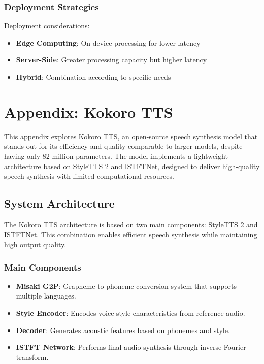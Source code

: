 \subsection{Deployment Strategies}
Deployment considerations:

\begin{itemize}
	\item \textbf{Edge Computing}: On-device processing for lower latency
	\item \textbf{Server-Side}: Greater processing capacity but higher latency
	\item \textbf{Hybrid}: Combination according to specific needs
\end{itemize}

\chapter{Appendix: Kokoro TTS}
\label{appendix-kokoro}

This appendix explores Kokoro TTS, an open-source speech synthesis model that stands out for its efficiency and quality comparable to larger models, despite having only 82 million parameters. The model implements a lightweight architecture based on StyleTTS 2 and ISTFTNet, designed to deliver high-quality speech synthesis with limited computational resources.

\section{System Architecture}
\label{sec:kokoro-architecture}

The Kokoro TTS architecture is based on two main components: StyleTTS 2 and ISTFTNet. This combination enables efficient speech synthesis while maintaining high output quality.

\subsection{Main Components}
\label{subsec:kokoro-main-components}

\begin{itemize}
	\item \textbf{Misaki G2P}: Grapheme-to-phoneme conversion system that supports multiple languages.
	\item \textbf{Style Encoder}: Encodes voice style characteristics from reference audio.
	\item \textbf{Decoder}: Generates acoustic features based on phonemes and style.
	\item \textbf{ISTFT Network}: Performs final audio synthesis through inverse Fourier transform.
\end{itemize}

